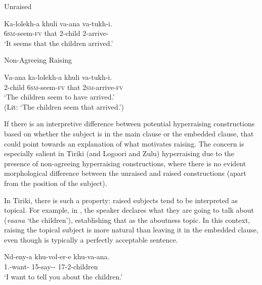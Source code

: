 \documentclass[output=paper,colorlinks,citecolor=brown
]{langscibook}
\begin{document}
\ea 
\begin{xlist}
\ex \label{ex:johnson:TirikiUnraisedConstruction2} {{Unraised}}

\gll Ka-lolekh-a khuli va-ana va-tukh-i.\\
\textsc{6sm-}seem-\textsc{fv} that 2-child 2\Sm-arrive-\Fv{}\\ 
\glt `It seems that the children arrived.'

\ex  \label{ex:johnson:IntroAgreeingRaising2} {{Non-Agreeing Raising}}

\gll Va-ana ka-lolekh-a khuli va-tukh-i.\\
2-child \textsc{6sm-}seem-\textsc{fv} that \textsc{2sm}-arrive-\textsc{fv}\\
\glt `The children seem to have arrived.'\\
(Lit: `The children seem that arrived.')
\end{xlist}
\z 

If there is an interpretive difference between potential hyperraising constructions based on whether the subject is in the main clause or the embedded clause, that could point towards an explanation of what motivates raising. The concern is especially salient in Tiriki (and Logoori and Zulu) hyperraising due to the presence of non-agreeing hyperraising constructions, where there is no evident morphological difference between the unraised and raised constructions (apart from the position of the subject). 

In Tiriki, there is such a property: raised subjects tend to be interpreted as topical. For example, in , the speaker declares what they are going to talk about (\textit{vaana} `the children'), establishing that as the aboutness topic. In this context, raising the topical subject is more natural than leaving it in the embedded clause, even though  is typically a perfectly acceptable sentence.

\ea\label{ex:johnson:RaisedVsUnraised}
\gll Nd-eny-a khu-vol-er-e khu-va-ana.\\
1\Sg.\Sm-want-\Fv{} 15\Sm-say-\Appl-\Fv{} 17-2-children \\
\glt `I want to tell you about the children.'
\end{document}
